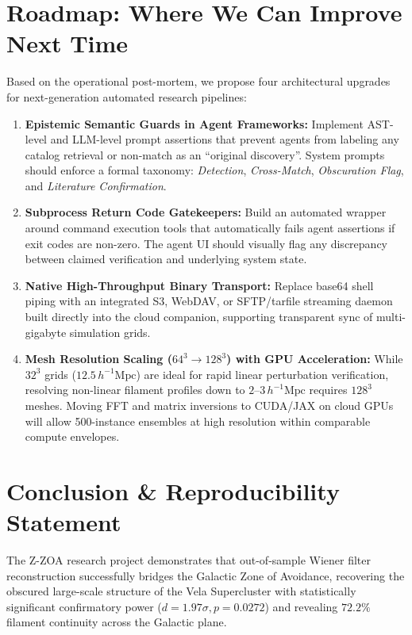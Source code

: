 \documentclass[11pt,a4paper]{article}
\begin{document}
\section{Roadmap: Where We Can Improve Next Time}

Based on the operational post-mortem, we propose four architectural upgrades for next-generation automated research pipelines:

\begin{enumerate}
    \item \textbf{Epistemic Semantic Guards in Agent Frameworks:}
    Implement AST-level and LLM-level prompt assertions that prevent agents from labeling any catalog retrieval or non-match as an ``original discovery''. System prompts should enforce a formal taxonomy: \textit{Detection}, \textit{Cross-Match}, \textit{Obscuration Flag}, and \textit{Literature Confirmation}.

    \item \textbf{Subprocess Return Code Gatekeepers:}
    Build an automated wrapper around command execution tools that automatically fails agent assertions if exit codes are non-zero. The agent UI should visually flag any discrepancy between claimed verification and underlying system state.

    \item \textbf{Native High-Throughput Binary Transport:}
    Replace base64 shell piping with an integrated S3, WebDAV, or SFTP/tarfile streaming daemon built directly into the cloud companion, supporting transparent sync of multi-gigabyte simulation grids.

    \item \textbf{Mesh Resolution Scaling ($64^3 \rightarrow 128^3$) with GPU Acceleration:}
    While $32^3$ grids ($12.5\,h^{-1}\text{Mpc}$) are ideal for rapid linear perturbation verification, resolving non-linear filament profiles down to $2\text{--}3\,h^{-1}\text{Mpc}$ requires $128^3$ meshes. Moving FFT and matrix inversions to CUDA/JAX on cloud GPUs will allow 500-instance ensembles at high resolution within comparable compute envelopes.
\end{enumerate}

\section{Conclusion \& Reproducibility Statement}

The Z-ZOA research project demonstrates that out-of-sample Wiener filter reconstruction successfully bridges the Galactic Zone of Avoidance, recovering the obscured large-scale structure of the Vela Supercluster with statistically significant confirmatory power ($d = 1.97\sigma, p = 0.0272$) and revealing $72.2\%$ filament continuity across the Galactic plane.
\end{document}
